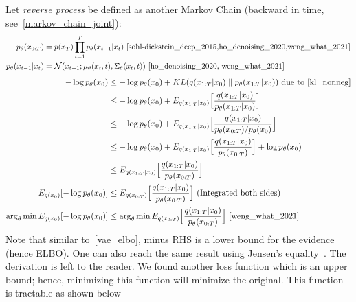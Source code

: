 \documentclass{article}
\numberwithin{equation}{subsection}
\begin{document}
Let \textit{reverse process} be defined as another Markov Chain (backward in time, see~\ref{markov_chain_joint}):
\begin{align}
    p_\theta(x_{0:T}) &= p(x_T)\prod_{t=1}^T p_\theta(x_{t-1}|x_t)~\cite{sohl-dickstein_deep_2015,ho_denoising_2020,weng_what_2021}\\
    p_\theta(x_{t-1}|x_t) &= \mathcal{N}(x_{t-1}; \mu_\theta(x_t, t), \Sigma_\theta(x_t,t))~\cite{ho_denoising_2020, weng_what_2021}
\end{align} 
\begin{align}
-\log p_\theta(x_0) 
&\leq -\log p_\theta(x_0)+KL(q(x_{1:T}|x_0) \parallel p_\theta(x_{1:T}|x_0))\ \text{due to~\ref{kl_nonneg}}\\
&\leq -\log p_\theta(x_0)+E_{q(x_{1:T}|x_0)}\Big[\frac{q(x_{1:T}|x_0)}{p_\theta(x_{1:T}|x_0)}\Big]\\
&\leq -\log p_\theta(x_0)+E_{q(x_{1:T}|x_0)}\Big[\frac{q(x_{1:T}|x_0)}{p_\theta(x_{0:T})/p_\theta(x_0)}\Big]\\
&\leq -\log p_\theta(x_0)+E_{q(x_{1:T}|x_0)}\Big[\frac{q(x_{1:T}|x_0)}{p_\theta(x_{0:T})}\Big]+\log p_\theta(x_0)\\
&\leq E_{q(x_{1:T}|x_0)}\Big[\frac{q(x_{1:T}|x_0)}{p_\theta(x_{0:T})}\Big]\\
E_{q(x_0)}[-\log p_\theta(x_0)] &\leq E_{q(x_{0:T})}\Big[\frac{q(x_{1:T}|x_0)}{p_\theta(x_{0:T})}\Big]\ \text{(Integrated both sides)}\\
\arg_\theta \min E_{q(x_0)}[-\log p_\theta(x_0)] &\leq \arg_\theta \min E_{q(x_{0:T})}\Big[\frac{q(x_{1:T}|x_0)}{p_\theta(x_{0:T})}\Big]~\cite{weng_what_2021}
\end{align}
Note that similar to~\ref{vae_elbo}, minus RHS is a lower bound for the evidence (hence ELBO). One can also reach the same result using Jensen's equality~\cite{sohl-dickstein_deep_2015,weng_what_2021}. The derivation is left to the reader. We found another loss function which is an upper bound; hence, minimizing this function will minimize the original. This function is tractable as shown below
\end{document}
